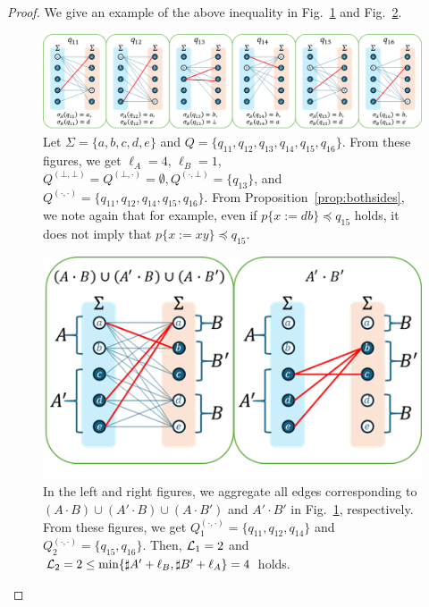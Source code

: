 \begin{proof}
{\color{red}
\noindent
We give an example of the above inequality in Fig.~\ref{fig:lem11-prop4-eachreg2} and Fig.~\ref{fig:lem11-prop4-totalreg2}.}
\begin{figure}[t]
  \begin{center}
    \includegraphics[scale=0.8]{figs/lem11-prop4-eachreg3.png}
    \caption{Let $\Sigma=\{a,b,c,d,e\}$ and $Q=\{q_{11},q_{12},q_{13},q_{14},q_{15},q_{16}\}$. From these figures, we get $\ell_A=4$, $\ell_B=1$, $Q^{(\bot,\bot)}=Q^{(\bot,\cdot)}=\emptyset, Q^{(\cdot,\bot)}=\{q_{13}\}$, and $Q^{(\cdot,\cdot)}=\{q_{11},q_{12},q_{14},q_{15},q_{16}\}$. From Proposition~\ref{prop:bothsides}, we note again that for example, even if $p \{ x:=db \} \preceq q_{15}$ holds, it does not imply that $p \{ x:=xy \} \preceq q_{15}$.}\label{fig:lem11-prop4-eachreg2}
  \end{center}
\end{figure}

\begin{figure}[t]
  \begin{center}
    \includegraphics[scale=0.8]{figs/lem11-prop4-totalreg3.png}
    \caption{In the left and right figures, we aggregate all edges corresponding to $(A\cdot B)\cup (A'\cdot B)\cup (A\cdot B')$ and $A'\cdot B'$ in Fig.~\ref{fig:lem11-prop4-eachreg2}, respectively. From these figures, we get $Q_{1}^{(\cdot,\cdot)}=\{q_{11},q_{12},q_{14}\}$ and $Q_{2}^{(\cdot,\cdot)}=\{q_{15},q_{16}\}$. Then, ${\cal L}_{1} = 2$ and ${\cal L}_{2} = 2 \leq \min\{\sharp A' + \ell_B, \sharp B' + \ell_A\} = 4$ holds.}\label{fig:lem11-prop4-totalreg2}
  \end{center}
\end{figure}


\end{proof}
